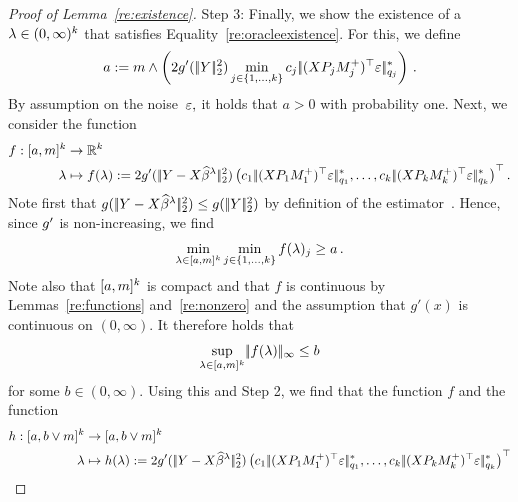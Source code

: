 \documentclass[bj]{imsart}
\newcommand{\normsup}[1]{\ensuremath{\!|\!| #1 | \! |_{\infty}}}
\newcommand{\normtwo}[1]{\ensuremath{\!|\!| #1 | \! |_{2}}}
\newcommand{\norm}[1]{\ensuremath{\!|\!| #1 | \! |}}
\newcommand{\1}{{\rm 1}\mskip -4,5mu{\rm l} }
\def\R{\mathbb{R}}
\begin{document}
\begin{proof}[Proof of Lemma~\ref{re:existence}]
Step 3: Finally, we show the existence of a $\lambda\in (0,\infty)^{k}$ that satisfies Equality~\eqref{re:oracleexistence}. For this, we define
\begin{equation*}
  a:=m\wedge \left(2\linkfunction'(\,\normtwo{\outcome}^2)\min_{j\in\{1,\dots,\numbergroups\}} \tuningrelax_j\,\norm{(\design \projectionmatrix_j\fusedmatrix_j^{+})^\top\noise}_{q_j}^*\right)\,.
\end{equation*}
By assumption on the noise~$\textcolor{black}{\varepsilon},$ it holds that $a>0$ with probability one. Next, we consider the function 
\begin{align*}
f: [a,m]^\numbergroups&\to \R^\numbergroups\\
\lambda&\mapsto f(\tuningparameter):=2g'(\,\normtwo{\outcome-\design\estimator^{\lambda}}^2)\left(\tuningrelax_1\,\norm{(\design \projectionmatrix_1\fusedmatrix_1^{+})^\top\noise}_{q_1}^*,\dots,\tuningrelax_k\,\norm{(\design \projectionmatrix_k\fusedmatrix_k^{+})^\top\noise}_{q_k}^*\right)^\top.
\end{align*}
Note first that $\linkfunction(\,\normtwo{\outcome-\design\estimatort}^2)\leq \linkfunction(\,\normtwo{\outcome}^2)$ by definition of the estimator~\estimatort.  Hence, since  $g'$ is non-increasing, we find
\begin{align*}
 \min_{\lambda\in[a,m]^{k}}  \min_{j\in\{1,\dots,k\}} f(\lambda)_j\geq a\,.
\end{align*}
Note also that $[a,m]^{k}$ is compact and that $f$ is continuous by Lemmas~\ref{re:functions} and~\ref{re:nonzero} and the assumption that $g'(x)$  is continuous on $(0,\infty)$. It therefore holds that 
\begin{equation*}
\sup_{\lambda\in[a,m]^\numbergroups} \normsup{f(\lambda)} \leq b
\end{equation*}
for some  $b\in(0,\infty).$ Using this and Step 2, we find that the function $f$ and the function
\begin{align*}
h: [a,b\vee m]^\numbergroups&\to [a,b\vee m]^\numbergroups\\
\lambda&\mapsto h(\tuningparameter):=2g'(\,\normtwo{\outcome-\design\estimator^{\lambda}}^2)\left(\tuningrelax_1\,\norm{(\design \projectionmatrix_1\fusedmatrix_1^{+})^\top\noise}_{q_1}^*,\dots,\tuningrelax_k\,\norm{(\design \projectionmatrix_k\fusedmatrix^{+}_k)^\top\noise}_{q_k}^*\right)^\top

\end{align*}
\end{proof}
\end{document}
